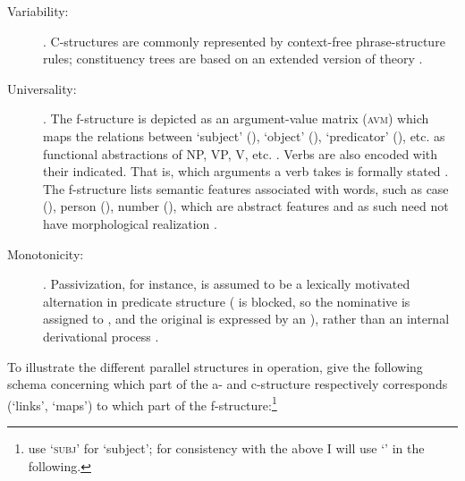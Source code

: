 \begin{description}
\item[Variability:] . 
C-structures are commonly represented by context-free phrase-structure rules; 
constituency trees are based on an extended version of  theory 
\citep[42]{bresnan2016}.

\item[Universality:] . The f-structure is depicted 
as an argument-value matrix (\textsc{avm}) which maps the relations between 
`subject' (\Sbj{}), `object' (\Obj{}), `predicator' (\Pred{}), etc. as 
functional abstractions of NP, VP, V, etc. \citep[42]{bresnan2016}. Verbs are 
also encoded with their  indicated. That is, which arguments 
a verb takes is formally stated \citep[15]{bresnan2016}. The f-structure lists 
semantic features associated with words, such as case (\Case{}), person 
(\Pers{}), number (\Num{}), which are abstract features and as such need not 
have morphological realization \citep[43]{bresnan2016}.

\item[Monotonicity:] . Passivization, for instance, is assumed to be a lexically 
motivated alternation in predicate structure (\Sbj{} is blocked, so 
the nominative is assigned to \Obj{}, and the original \Sbj{} is expressed 
by an \Adjc{}), rather than an internal derivational process 
\citep[23\psqq]{bresnan2016}.

\end{description}

To illustrate the different parallel structures in operation, 
\citet[15]{bresnan2016} give the following schema concerning which part 
of the a- and c-structure respectively corresponds (`links', `maps') to which 
part of the f-structure:\footnote{\citet{bresnan2016} use \textsc{`subj'} for 
`subject'; for consistency with the above I will use `\Sbj{}' in the following.}


